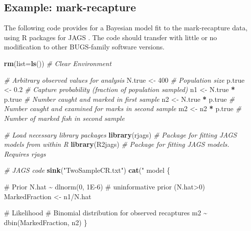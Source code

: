 \documentclass[
]{krantz}
\makeatletter
\newenvironment{Shaded}{\begin{snugshade}}{\end{snugshade}}
\newcommand{\AttributeTok}[1]{\textcolor[rgb]{0.27,0.27,0.27}{#1}}
\newcommand{\CommentTok}[1]{\textcolor[rgb]{0.37,0.37,0.37}{\textit{#1}}}
\newcommand{\DecValTok}[1]{\textcolor[rgb]{0.06,0.06,0.06}{#1}}
\newcommand{\FloatTok}[1]{\textcolor[rgb]{0.06,0.06,0.06}{#1}}
\newcommand{\FunctionTok}[1]{\textcolor[rgb]{0.27,0.27,0.27}{\textbf{#1}}}
\newcommand{\NormalTok}[1]{#1}
\newcommand{\OtherTok}[1]{\textcolor[rgb]{0.37,0.37,0.37}{#1}}
\newcommand{\SpecialCharTok}[1]{\textcolor[rgb]{0.43,0.43,0.43}{\textbf{#1}}}
\newcommand{\StringTok}[1]{\textcolor[rgb]{0.5,0.5,0.5}{#1}}
\newenvironment{kframe}{%
\medskip{}
\setlength{\fboxsep}{.8em}
 \def\at@end@of@kframe{}%
 \ifinner\ifhmode%
  \def\at@end@of@kframe{\end{minipage}}%
  \begin{minipage}{\columnwidth}%
 \fi\fi%
 \def\FrameCommand##1{\hskip\@totalleftmargin \hskip-\fboxsep
 \colorbox{shadecolor}{##1}\hskip-\fboxsep
     \hskip-\linewidth \hskip-\@totalleftmargin \hskip\columnwidth}%
 \MakeFramed {\advance\hsize-\width
   \@totalleftmargin\z@ \linewidth\hsize
   \@setminipage}}%
 {\par\unskip\endMakeFramed%
 \at@end@of@kframe}
\renewenvironment{Shaded}{\begin{kframe}}{\end{kframe}}
\makeatother
\begin{document}
\hypertarget{FirstExampleBayesian}{%
\subsection{Example: mark-recapture}\label{FirstExampleBayesian}}

The following code provides for a Bayesian model fit to the mark-recapture data, using R packages for JAGS \citep{plummer2003}. The code should transfer with little or no modification to other BUGS-family software versions.

\begin{Shaded}
\begin{Highlighting}[]
\FunctionTok{rm}\NormalTok{(}\AttributeTok{list=}\FunctionTok{ls}\NormalTok{()) }\CommentTok{\# Clear Environment}

\CommentTok{\# Arbitrary \textquotesingle{}observed\textquotesingle{} values for analysis}
\NormalTok{N.true }\OtherTok{\textless{}{-}} \DecValTok{400}  \CommentTok{\# Population size}
\NormalTok{p.true }\OtherTok{\textless{}{-}} \FloatTok{0.2} \CommentTok{\# Capture probability (fraction of population sampled)}
\NormalTok{n1 }\OtherTok{\textless{}{-}}\NormalTok{ N.true }\SpecialCharTok{*}\NormalTok{ p.true }\CommentTok{\# Number caught and marked in first sample}
\NormalTok{n2 }\OtherTok{\textless{}{-}}\NormalTok{ N.true }\SpecialCharTok{*}\NormalTok{ p.true }\CommentTok{\# Number caught and examined for marks in second sample}
\NormalTok{m2 }\OtherTok{\textless{}{-}}\NormalTok{ n2 }\SpecialCharTok{*}\NormalTok{ p.true }\CommentTok{\# Number of marked fish in second sample}

\CommentTok{\# Load necessary library packages}
\FunctionTok{library}\NormalTok{(rjags)   }\CommentTok{\# Package for fitting JAGS models from within R}
\FunctionTok{library}\NormalTok{(R2jags)  }\CommentTok{\# Package for fitting JAGS models. Requires rjags}

\CommentTok{\# JAGS code}
\FunctionTok{sink}\NormalTok{(}\StringTok{"TwoSampleCR.txt"}\NormalTok{)}
\FunctionTok{cat}\NormalTok{(}\StringTok{"}
\StringTok{    model \{}

\StringTok{  \# Prior}
\StringTok{    N.hat \textasciitilde{} dlnorm(0, 1E{-}6) \# uninformative prior (N.hat\textgreater{}0)}
\StringTok{    MarkedFraction \textless{}{-} n1/N.hat}

\StringTok{  \# Likelihood}
\StringTok{    \# Binomial distribution for observed recaptures}
\StringTok{    m2 \textasciitilde{} dbin(MarkedFraction, n2)}
\StringTok{    \}}


\end{Highlighting}
\end{Shaded}
\end{document}
